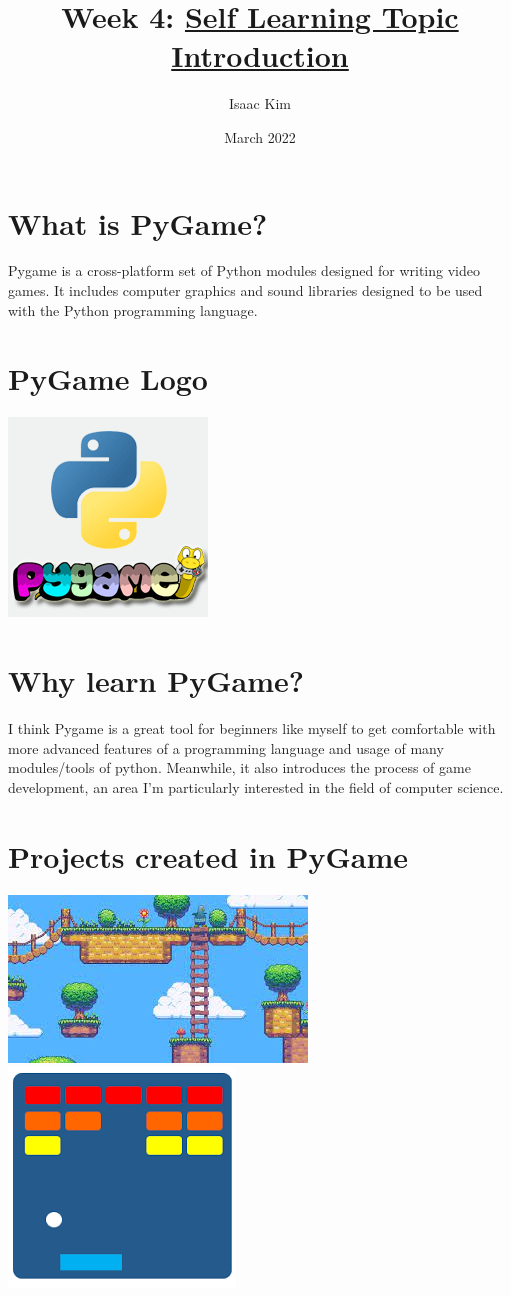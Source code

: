 \documentclass[20pt]{article}
\title{\textbf{Week 4:} 
\underline{Self Learning Topic Introduction}}
\author{Isaac Kim}
\date{March 2022}
\begin{document}
\maketitle 

\section{What is PyGame?}
Pygame is a cross-platform set of Python modules designed for writing video games. It includes computer graphics and sound libraries designed to be used with the Python programming language.

\section{PyGame Logo}
\includegraphics{pygame_logo.png}

\section{Why learn PyGame?}
I think Pygame is a great tool for beginners like myself to get comfortable with more advanced 
features of a programming language and usage of many modules/tools of python. Meanwhile, it also 
introduces the process of game development, an area I'm particularly interested in the field of computer science.

\section{Projects created in PyGame}
\includegraphics{pygameEx1.jpg}
\\
\includegraphics{PygameEx2.png}
\end{document}
